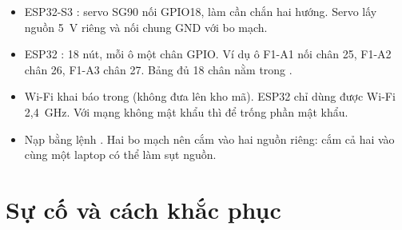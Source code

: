 \begin{itemize}
  \item ESP32-S3 : servo SG90 nối GPIO18, làm cần chắn hai hướng. Servo lấy nguồn 5~V riêng và nối chung GND với bo mạch.
  \item ESP32 : 18 nút, mỗi ô một chân GPIO. Ví dụ ô F1-A1 nối chân 25, F1-A2 chân 26, F1-A3 chân 27. Bảng đủ 18 chân nằm trong .
  \item Wi-Fi khai báo trong  (không đưa lên kho mã). ESP32 chỉ dùng được Wi-Fi 2,4~GHz. Với mạng không mật khẩu thì để trống phần mật khẩu.
  \item Nạp bằng lệnh . Hai bo mạch nên cắm vào hai nguồn riêng: cắm cả hai vào cùng một laptop có thể làm sụt nguồn.
\end{itemize}

\section{Sự cố và cách khắc phục}

